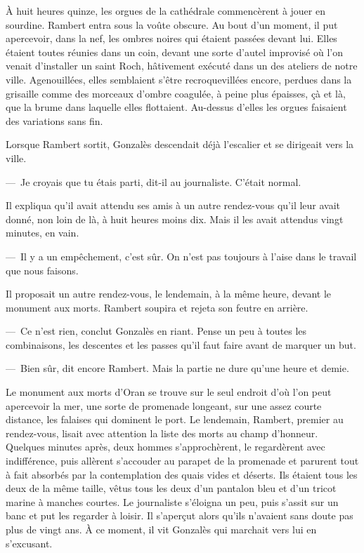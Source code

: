 \documentclass[french,twoside]{book} %
\begin{document}
À huit heures quinze, les orgues de la cathédrale commencèrent à jouer en sourdine. Rambert entra sous la voûte obscure. Au bout d’un moment, il put apercevoir, dans la nef, les ombres noires qui étaient passées devant lui. Elles étaient toutes réunies dans un coin, devant une sorte d’autel improvisé où l’on venait d’installer un saint Roch, hâtivement exécuté dans un des ateliers de notre ville. Agenouillées, elles semblaient s’être recroquevillées encore, perdues dans la grisaille comme des morceaux d’ombre coagulée, à peine plus épaisses, çà et là, que la brume dans laquelle elles flottaient. Au-dessus d’elles les orgues faisaient des variations sans fin.\par
Lorsque Rambert sortit, Gonzalès descendait déjà l’escalier et se dirigeait vers la ville.\par
— Je croyais que tu étais parti, dit-il au journaliste. C’était normal.\par
Il expliqua qu’il avait attendu ses amis à un autre rendez-vous qu’il leur avait donné, non loin de là, à huit heures moins dix. Mais il les avait attendus vingt minutes, en vain.\par
— Il y a un empêchement, c’est sûr. On n’est pas toujours à l’aise dans le travail que nous faisons.\par
Il proposait un autre rendez-vous, le lendemain, à la même heure, devant le monument aux morts. Rambert soupira et rejeta son feutre en arrière.\par
— Ce n’est rien, conclut Gonzalès en riant. Pense un peu à toutes les combinaisons, les descentes et les passes qu’il faut faire avant de marquer un but.\par
— Bien sûr, dit encore Rambert. Mais la partie ne dure qu’une heure et demie.\par
Le monument aux morts d’Oran se trouve sur le seul endroit d’où l’on peut apercevoir la mer, une sorte de promenade longeant, sur une assez courte distance, les falaises qui dominent le port. Le lendemain, Rambert, premier au rendez-vous, lisait avec attention la liste des morts au champ d’honneur. Quelques minutes après, deux hommes s’approchèrent, le regardèrent avec indifférence, puis allèrent s’accouder au parapet de la promenade et parurent tout à fait absorbés par la contemplation des quais vides et déserts. Ils étaient tous les deux de la même taille, vêtus tous les deux d’un pantalon bleu et d’un tricot marine à manches courtes. Le journaliste s’éloigna un peu, puis s’assit sur un banc et put les regarder à loisir. Il s’aperçut alors qu’ils n’avaient sans doute pas plus de vingt ans. À ce moment, il vit Gonzalès qui marchait vers lui en s’excusant.\par
\end{document}
